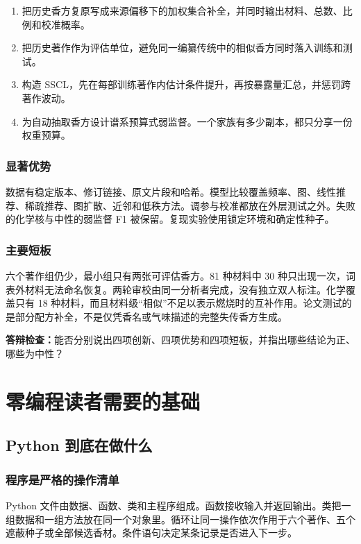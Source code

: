 \documentclass[UTF8,11pt,openany,fontset=none]{ctexbook}
\newcommand{\SSCL}{\textsc{SSCL}}
\newcommand{\answercheck}[1]{\par\smallskip\noindent\textbf{答辩检查：}#1\par}
\begin{document}
\begin{enumerate}
\item 把历史香方复原写成来源偏移下的加权集合补全，并同时输出材料、总数、比例和校准概率。
\item 把历史著作作为评估单位，避免同一编纂传统中的相似香方同时落入训练和测试。
\item 构造 \SSCL{}，先在每部训练著作内估计条件提升，再按暴露量汇总，并惩罚跨著作波动。
\item 为自动抽取香方设计谱系预算式弱监督。一个家族有多少副本，都只分享一份权重预算。
\end{enumerate}

\section{显著优势}

数据有稳定版本、修订链接、原文片段和哈希。模型比较覆盖频率、图、线性推荐、稀疏推荐、图扩散、近邻和低秩方法。调参与校准都放在外层测试之外。失败的化学核与中性的弱监督 F1 被保留。复现实验使用锁定环境和确定性种子。

\section{主要短板}

六个著作组仍少，最小组只有两张可评估香方。81 种材料中 30 种只出现一次，词表外材料无法命名恢复。两轮审校由同一分析者完成，没有独立双人标注。化学覆盖只有 18 种材料，而且材料级“相似”不足以表示燃烧时的互补作用。论文测试的是部分配方补全，不是仅凭香名或气味描述的完整失传香方生成。

\answercheck{能否分别说出四项创新、四项优势和四项短板，并指出哪些结论为正、哪些为中性？}

\part{零编程读者需要的基础}

\chapter{Python 到底在做什么}

\section{程序是严格的操作清单}

Python 文件由数据、函数、类和主程序组成。函数接收输入并返回输出。类把一组数据和一组方法放在同一个对象里。循环让同一操作依次作用于六个著作、五个遮蔽种子或全部候选香材。条件语句决定某条记录是否进入下一步。
\end{document}
